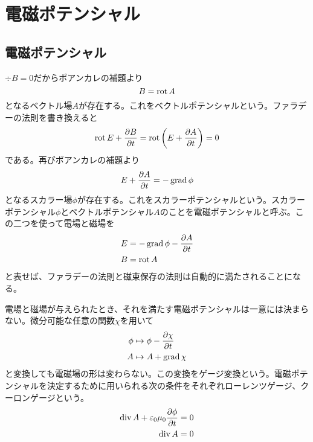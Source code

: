 \section{電磁ポテンシャル}

\subsection{電磁ポテンシャル}
    $\div B = 0$だからポアンカレの補題より
        \[B = \rot A\]
    となるベクトル場$A$が存在する。これをベクトルポテンシャルという。ファラデーの法則を書き換えると
        \[\rot E + \pd[B]{t} = \rot\left(E + \pd[A]{t}\right) = 0\]
    である。再びポアンカレの補題より
        \[E + \pd[A]{t} = -\grad\phi\]
    となるスカラー場$\phi$が存在する。これをスカラーポテンシャルという。スカラーポテンシャル$\phi$とベクトルポテンシャル$A$のことを電磁ポテンシャルと呼ぶ。この二つを使って電場と磁場を
    \begin{align*}
        E &= -\grad \phi - \pd[A]{t}\\
        B &= \rot A
    \end{align*}
    と表せば、ファラデーの法則と磁束保存の法則は自動的に満たされることになる。

    電場と磁場が与えられたとき、それを満たす電磁ポテンシャルは一意には決まらない。微分可能な任意の関数$\chi$を用いて
    \begin{align*}
        \phi &\mapsto \phi - \pd[\chi]{t}\\
        A &\mapsto A + \grad\chi
    \end{align*}
    と変換しても電磁場の形は変わらない。この変換をゲージ変換という。電磁ポテンシャルを決定するために用いられる次の条件をそれぞれローレンツゲージ、クーロンゲージという。
    \begin{align*}
        \div A + \epsilon_0\mu_0\pd[\phi]{t} &= 0\\
        \div A &= 0
    \end{align*}

